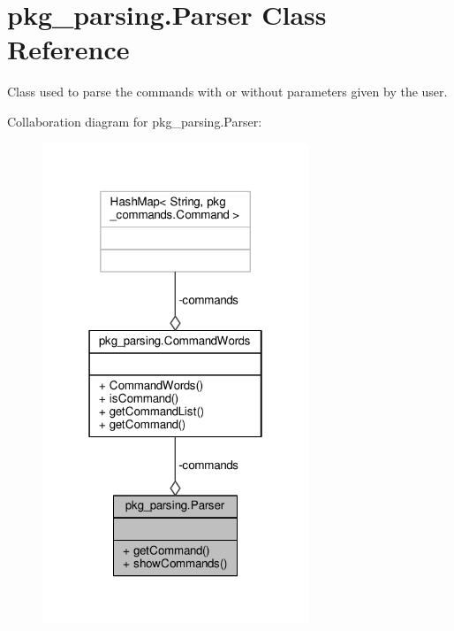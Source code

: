 \hypertarget{classpkg__parsing_1_1Parser}{\section{pkg\-\_\-parsing.\-Parser Class Reference}
\label{classpkg__parsing_1_1Parser}
}


Class used to parse the commands with or without parameters given by the user.  




Collaboration diagram for pkg\-\_\-parsing.\-Parser\-:
\nopagebreak
\begin{figure}[H]
\begin{center}
\leavevmode
\includegraphics[width=226pt]{classpkg__parsing_1_1Parser__coll__graph}
\end{center}
\end{figure}
